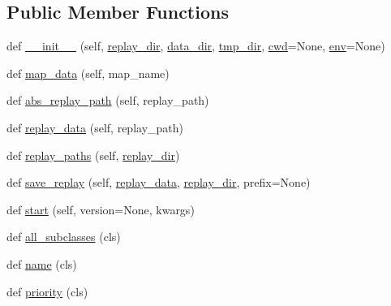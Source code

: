 \subsection*{Public Member Functions}
\begin{DoxyCompactItemize}
\item 
def \mbox{\hyperlink{classpysc2_1_1run__configs_1_1lib_1_1_run_config_abd1454befc5a4343a64b39c25ab20698}{\+\_\+\+\_\+init\+\_\+\+\_\+}} (self, \mbox{\hyperlink{classpysc2_1_1run__configs_1_1lib_1_1_run_config_aca6d18d30df342636c175478332b6aa3}{replay\+\_\+dir}}, \mbox{\hyperlink{classpysc2_1_1run__configs_1_1lib_1_1_run_config_aab93dda31495e5968f79bdf77e139710}{data\+\_\+dir}}, \mbox{\hyperlink{classpysc2_1_1run__configs_1_1lib_1_1_run_config_ab335f1c1061e8b70ef0c1ecf8834d4a8}{tmp\+\_\+dir}}, \mbox{\hyperlink{classpysc2_1_1run__configs_1_1lib_1_1_run_config_af8bd9eeb877d8de7ac75b455799d88bf}{cwd}}=None, \mbox{\hyperlink{classpysc2_1_1run__configs_1_1lib_1_1_run_config_aae2166085e6fd820345e8af02743b7aa}{env}}=None)
\item 
def \mbox{\hyperlink{classpysc2_1_1run__configs_1_1lib_1_1_run_config_adc54814ab2a8ccdf0f19e11d006e30df}{map\+\_\+data}} (self, map\+\_\+name)
\item 
def \mbox{\hyperlink{classpysc2_1_1run__configs_1_1lib_1_1_run_config_aaca5669c522ce76daf84075a40de9e3f}{abs\+\_\+replay\+\_\+path}} (self, replay\+\_\+path)
\item 
def \mbox{\hyperlink{classpysc2_1_1run__configs_1_1lib_1_1_run_config_a59a4465acde9c23d45d3186275b4b9e9}{replay\+\_\+data}} (self, replay\+\_\+path)
\item 
def \mbox{\hyperlink{classpysc2_1_1run__configs_1_1lib_1_1_run_config_ab57b5db47c2e8061b223eac014c77098}{replay\+\_\+paths}} (self, \mbox{\hyperlink{classpysc2_1_1run__configs_1_1lib_1_1_run_config_aca6d18d30df342636c175478332b6aa3}{replay\+\_\+dir}})
\item 
def \mbox{\hyperlink{classpysc2_1_1run__configs_1_1lib_1_1_run_config_a7ba199b4c7d8503dd9d8bbdbdf13ede8}{save\+\_\+replay}} (self, \mbox{\hyperlink{classpysc2_1_1run__configs_1_1lib_1_1_run_config_a59a4465acde9c23d45d3186275b4b9e9}{replay\+\_\+data}}, \mbox{\hyperlink{classpysc2_1_1run__configs_1_1lib_1_1_run_config_aca6d18d30df342636c175478332b6aa3}{replay\+\_\+dir}}, prefix=None)
\item 
def \mbox{\hyperlink{classpysc2_1_1run__configs_1_1lib_1_1_run_config_a3fb702fa3f4fe48d6d4fe2f3cfe289e8}{start}} (self, version=None, kwargs)
\item 
def \mbox{\hyperlink{classpysc2_1_1run__configs_1_1lib_1_1_run_config_a33621ff0a10545ef72e99fb96e4eb76c}{all\+\_\+subclasses}} (cls)
\item 
def \mbox{\hyperlink{classpysc2_1_1run__configs_1_1lib_1_1_run_config_acd21dd2a75fcb4023287d6dc23a7a193}{name}} (cls)
\item 
def \mbox{\hyperlink{classpysc2_1_1run__configs_1_1lib_1_1_run_config_ad01a3bc9eb157d41f66de62931f27948}{priority}} (cls)
\end{DoxyCompactItemize}
